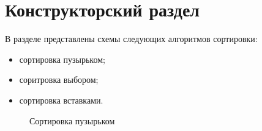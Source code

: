 \chapter{Конструкторский раздел}
В разделе представлены схемы следующих алгоритмов сортировки:
\begin{itemize}
	\item сортировка пузырьком;
	\item соритровка выбором;
	\item сортировка вставками.
\end{itemize}

\begin{figure}
	\caption{Сортировка пузырьком}
\end{figure}

